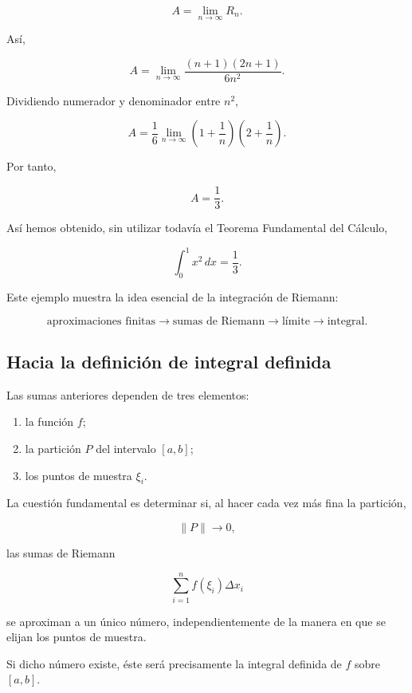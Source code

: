 \documentclass[12pt]{article}
\begin{document}
\[
A
=
\lim_{n\to\infty}R_n.
\]

Así,

\[
A
=
\lim_{n\to\infty}
\frac{(n+1)(2n+1)}{6n^2}.
\]

Dividiendo numerador y denominador entre $n^2$,

\[
A
=
\frac{1}{6}
\lim_{n\to\infty}
\left(1+\frac{1}{n}\right)
\left(2+\frac{1}{n}\right).
\]

Por tanto,

\[
\boxed{
A=\frac{1}{3}.
}
\]

Así hemos obtenido, sin utilizar todavía el Teorema Fundamental del
Cálculo,

\[
\int_0^1x^2\,dx=\frac{1}{3}.
\]

Este ejemplo muestra la idea esencial de la integración de Riemann:

\[
\boxed{
\text{aproximaciones finitas}
\longrightarrow
\text{sumas de Riemann}
\longrightarrow
\text{límite}
\longrightarrow
\text{integral}.
}
\]

\subsection{Hacia la definición de integral definida}

Las sumas anteriores dependen de tres elementos:

\begin{enumerate}

    \item la función $f$;

    \item la partición $P$ del intervalo $[a,b]$;

    \item los puntos de muestra $\xi_i$.

\end{enumerate}

La cuestión fundamental es determinar si, al hacer cada vez más fina la
partición,

\[
\|P\|\longrightarrow0,
\]

las sumas de Riemann

\[
\sum_{i=1}^{n}f(\xi_i)\Delta x_i
\]

se aproximan a un único número, independientemente de la manera en que se
elijan los puntos de muestra.

Si dicho número existe, éste será precisamente la integral definida de
$f$ sobre $[a,b]$.
\end{document}
